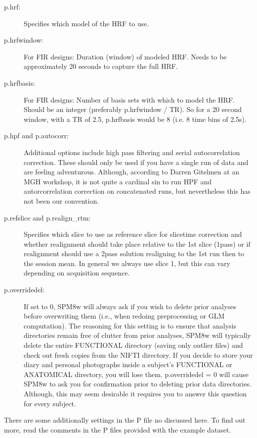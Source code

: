 \documentclass[12pt]{article}
\begin{document}
\begin{description}
\item[p.hrf:] Specifies which model of the HRF to use. 
\item[p.hrfwindow:] For FIR designs: Duration (window) of modeled HRF. Needs to be approximately 20 seconds to capture the full HRF. 
\item[p.hrfbasis:] For FIR designs: Number of basis sets with which to model the HRF. Should be an integer (preferably p.hrfwindow / TR). So for a 20 second window, with a TR of 2.5, p.hrfbasis would be 8 (i.e. 8 time bins of 2.5s). 
\item[p.hpf and p.autocorr:] Additional options include high pass filtering and serial autocorrelation correction. These should only be used if you have a single run of data and are feeling adventurous. Although, according to Darren Gitelmen at an MGH workshop, it is not quite a cardinal sin to run HPF and autorcorrelation correction on concatenated runs, but nevertheless this has not been our convention. 
\item[p.refslice and p.realign\_rtm:] Specifies which slice to use as reference slice for slicetime correction and whether realignment should take place relative to the 1st slice (1pass) or if realignment should use a 2pass solution realigning to the 1st run then to the session mean. In general we always use slice 1, but this can vary depending on acquisition sequence.
\item[p.overridedel:] If set to 0, SPM8w will always ask if you wish to delete prior analyses before overwriting them (i.e., when redoing preprocessing or GLM computation). The reasoning for this setting is to ensure that analysis directories remain free of clutter from prior analyses, SPM8w will typically delete the entire FUNCTIONAL directory (saving only outlier files) and check out fresh copies from the NIFTI directory. If you decide to store your diary and personal photographs inside a subject's FUNCTIONAL or ANATOMICAL directory, you will lose them. p.overridedel = 0 will cause SPM8w to ask you for confirmation prior to deleting prior data directories. Although, this may seem desirable it requires you to answer this question for every subject. 
\end{description}


There are some additionally settings in the P file no discussed here. To find out more, read the comments in the P files provided with the example dataset. 
\end{document}
